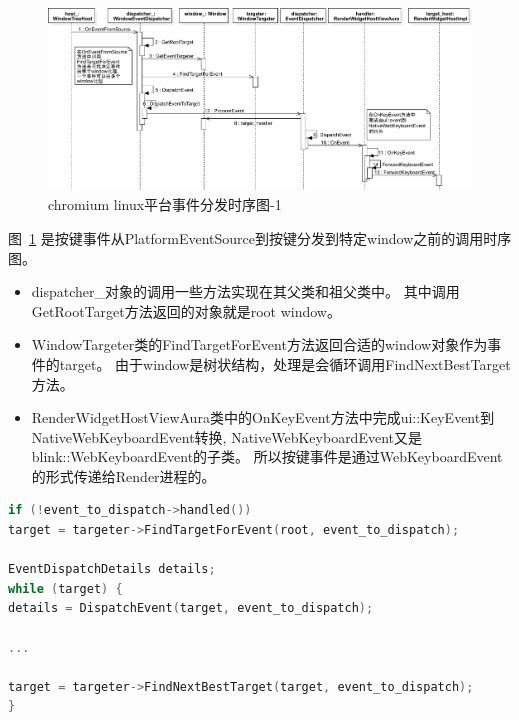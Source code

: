 \documentclass[12pt]{article}
\begin{document}
\begin{figure}[H] 
  \centering 
  \includegraphics[width=\textwidth]{image/linux_event_dispatch_sequence_2.pdf} 
  \caption{chromium linux平台事件分发时序图-1} \label{fig:linux_event_dispatch_sequence2} 
\end{figure}

图~\ref{fig:linux_event_dispatch_sequence2}
是按键事件从PlatformEventSource到按键分发到特定window之前的调用时序图。

\begin{itemize}
  \item dispatcher\_对象的调用一些方法实现在其父类和祖父类中。
  其中调用GetRootTarget方法返回的对象就是root window。
  \item WindowTargeter类的FindTargetForEvent方法返回合适的window对象作为事件的target。
  由于window是树状结构，处理是会循环调用FindNextBestTarget方法。
  \item RenderWidgetHostViewAura类中的OnKeyEvent方法中完成ui::KeyEvent到NativeWebKeyboardEvent转换,
  NativeWebKeyboardEvent又是blink::WebKeyboardEvent的子类。
  所以按键事件是通过WebKeyboardEvent的形式传递给Render进程的。
\end{itemize}

\begin{spacing}{1.0}
\begin{lstlisting}[language={C++}]
if (!event_to_dispatch->handled())
target = targeter->FindTargetForEvent(root, event_to_dispatch);

EventDispatchDetails details;
while (target) {
details = DispatchEvent(target, event_to_dispatch);

...
  
target = targeter->FindNextBestTarget(target, event_to_dispatch);
}
\end{lstlisting}
\end{spacing}

\end{document}
